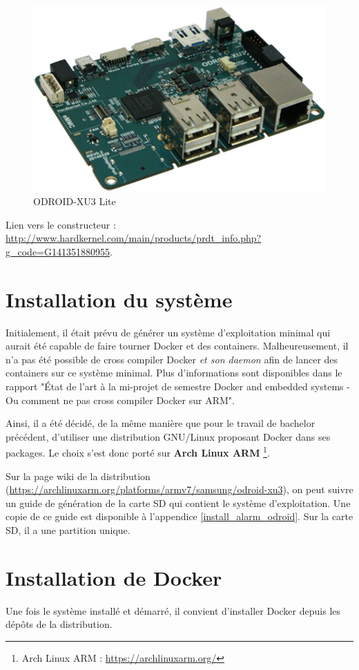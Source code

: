 \documentclass[11pt,a4paper,oneside]{report}
\newcommand{\oldreportname}{État de l’art à la mi-projet de semestre Docker and embedded systems - Ou comment ne pas cross compiler Docker sur ARM}
\newcommand{\odroid}{ODROID-XU3 Lite }
\begin{document}
\begin{figure}[hbtp]
\centering
\includegraphics[scale=0.5]{img/ODROIDXU3Lite.jpg}
\caption{\odroid}
\end{figure}

Lien vers le constructeur : \url{http://www.hardkernel.com/main/products/prdt_info.php?g_code=G141351880955}.

\section{Installation du système}

Initialement, il était prévu de générer un système d'exploitation minimal qui aurait été capable de faire tourner Docker et des containers. Malheureusement, il n'a pas été possible de cross compiler Docker \textit{et son daemon} afin de lancer des containers sur ce système minimal. Plus d'informations sont disponibles dans le rapport "\oldreportname".

Ainsi, il a été décidé, de la même manière que pour le travail de bachelor précédent, d'utiliser une distribution GNU/Linux proposant Docker dans ses packages. Le choix s'est donc porté sur \textbf{Arch Linux ARM} \footnote{Arch Linux ARM : \url{https://archlinuxarm.org/}}.

Sur la page wiki de la distribution (\url{https://archlinuxarm.org/platforms/armv7/samsung/odroid-xu3}), on peut suivre un guide de génération de la carte SD qui contient le système d'exploitation. Une copie de ce guide est disponible à l'appendice \ref{install_alarm_odroid}. Sur la carte SD, il a une partition unique.


\section{Installation de Docker}
Une fois le système installé et démarré, il convient d'installer Docker depuis les dépôts de la distribution.
\end{document}
